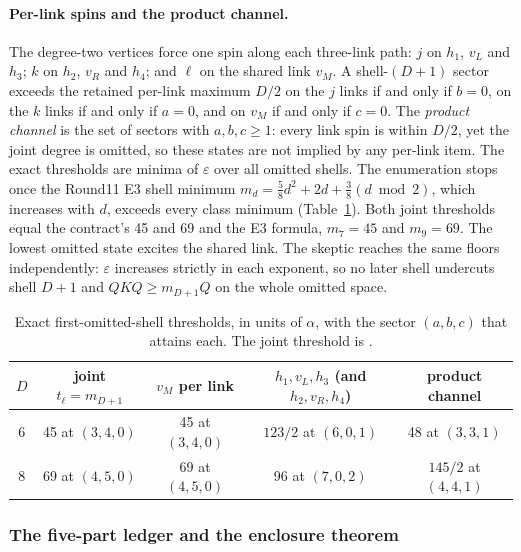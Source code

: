 \paragraph{Per-link spins and the product channel.}
The degree-two vertices force one spin along each three-link path: $j$ on
$h_1$, $v_L$ and $h_3$; $k$ on $h_2$, $v_R$ and $h_4$; and $\ell$ on the
shared link $v_M$. A shell-$(D+1)$ sector exceeds the retained per-link
maximum $D/2$ on the $j$ links if and only if $b=0$, on the $k$ links if and
only if $a=0$, and on $v_M$ if and only if $c=0$. The \emph{product channel}
is the set of sectors with $a,b,c\ge1$: every link spin is within $D/2$, yet
the joint degree is omitted, so these states are not implied by any per-link
item. The exact thresholds are minima of $\varepsilon$ over all omitted
shells. The enumeration stops once the Round11 E3 shell minimum
$m_d=\tfrac58d^2+2d+\tfrac38(d\bmod2)$, which increases with $d$, exceeds
every class minimum (Table~\ref{tab:az2-thresholds}). Both joint thresholds
equal the contract's 45 and 69 and the E3 formula, $m_7=45$ and $m_9=69$. The
lowest omitted state excites the shared link. The skeptic reaches the same
floors independently: $\varepsilon$ increases strictly in each exponent, so
no later shell undercuts shell $D+1$ and $QKQ\ge m_{D+1}Q$ on the whole
omitted space.

\begin{table}[htbp]
\centering\small
\caption{Exact first-omitted-shell thresholds, in units of $\alpha$, with the
sector $(a,b,c)$ that attains each. The joint threshold is
.}
\label{tab:az2-thresholds}
\begin{tabular}{@{}ccccc@{}}
\toprule
$D$ & joint $t_\ell=m_{D+1}$ & $v_M$ per link & $h_1,v_L,h_3$ (and $h_2,v_R,h_4$) & product channel\\
\midrule
6 & 45 at $(3,4,0)$ & 45 at $(3,4,0)$ & $123/2$ at $(6,0,1)$ & 48 at $(3,3,1)$\\
8 & 69 at $(4,5,0)$ & 69 at $(4,5,0)$ & 96 at $(7,0,2)$ & $145/2$ at $(4,4,1)$\\
\bottomrule
\end{tabular}
\end{table}

\subsubsection{The five-part ledger and the enclosure theorem}
\label{sec:az2-ledger}
